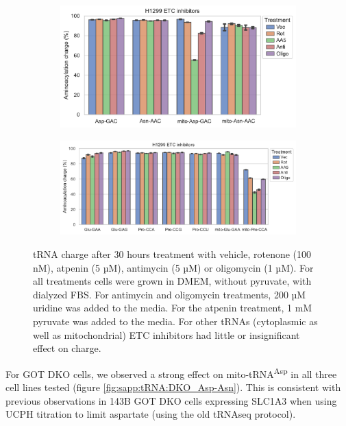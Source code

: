 \begin{figure}[!ht]
     \centering
     \begin{subfigure}[b]{0.6\textwidth}
         \includegraphics[width=\textwidth]{figures/sapp/tRNA/H1299_ETCinhib_Asp-Asn.pdf}
     \end{subfigure}
     \begin{subfigure}[b]{0.8\textwidth}
         \vspace{5pt}
         \includegraphics[width=\textwidth]{figures/sapp/tRNA/H1299_ETCinhib_Glu-Pro.pdf}
     \end{subfigure}
     \hfill
        \caption[ETC inhibitor in H1299, effect on tRNA charge.]{
        tRNA charge after 30 hours treatment with vehicle, rotenone (100 nM), atpenin (5 µM), antimycin (5 µM) or oligomycin (1 µM).
        For all treatments cells were grown in DMEM, without pyruvate, with dialyzed FBS.
        For antimycin and oligomycin treatments, 200 µM uridine was added to the media.
        For the atpenin treatment, 1 mM pyruvate was added to the media.
        For other tRNAs (cytoplasmic as well as mitochondrial) ETC inhibitors had little or insignificant effect on charge.
        }
        \label{fig:sapp:tRNA:H1299_ETCinhib}
\end{figure}


\FloatBarrier
For GOT DKO cells, we observed a strong effect on mito-tRNA\textsuperscript{Asp} in all three cell lines tested (figure \ref{fig:sapp:tRNA:DKO_Asp-Asn}).
This is consistent with previous observations in 143B GOT DKO cells expressing SLC1A3 when using UCPH titration to limit aspartate (using the old tRNAseq protocol).

